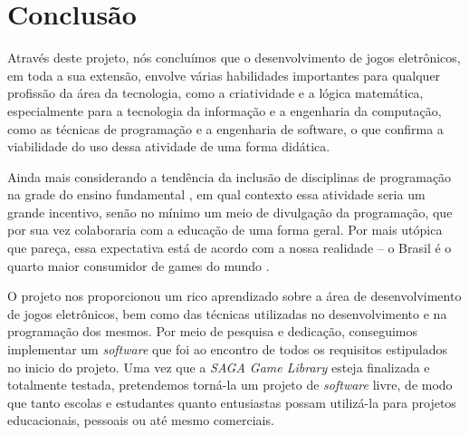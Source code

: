 \chapter{Conclusão}
\label{conclusao}
%
Através deste projeto, nós concluímos que o desenvolvimento de jogos eletrônicos, em toda a sua extensão, envolve várias habilidades importantes para qualquer profissão da área da tecnologia, como a criatividade e a lógica matemática, especialmente para a tecnologia da informação e a engenharia da computação, como as técnicas de programação e a engenharia de software, o que confirma a viabilidade do uso dessa atividade de uma forma didática.

Ainda mais considerando a tendência da inclusão de disciplinas de programação na grade do ensino fundamental \nocite{OLHARDIG}, em qual contexto essa atividade seria um grande incentivo, senão no mínimo um meio de divulgação da programação, que por sua vez colaboraria com a educação de uma forma geral. Por mais utópica que pareça, essa expectativa está de acordo com a nossa realidade -- o Brasil é o quarto maior consumidor de games do mundo \nocite{ESTADAO}. 
\par 
O projeto nos proporcionou um rico aprendizado sobre a área de desenvolvimento de jogos eletrônicos, bem como das técnicas utilizadas no desenvolvimento e na programação dos mesmos. Por meio de pesquisa e dedicação, conseguimos implementar um \textit{software} que foi ao encontro de todos os requisitos estipulados no inicio do projeto. Uma vez que a \textit{SAGA Game Library} esteja finalizada e totalmente testada, pretendemos torná-la um projeto de \textit{software} livre, de modo que tanto escolas e estudantes quanto entusiastas possam utilizá-la para projetos educacionais, pessoais ou até mesmo comerciais.